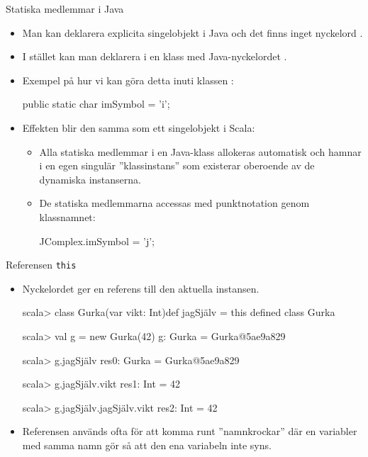 \begin{Slide}{Statiska medlemmar i Java}
\begin{itemize}
\item Man kan  deklarera explicita singelobjekt i Java och det finns inget nyckelord .

\item I stället kan man deklarera  i en klass med Java-nyckelordet .

\item Exempel på hur vi kan göra detta inuti klassen :

\begin{Code}[language=Java,basicstyle=\SlideFontSize{10}{12}\ttfamily\selectfont]
    public static char imSymbol = 'i';
\end{Code}

\item Effekten blir den samma som ett singelobjekt i Scala:
\begin{itemize}
\item Alla statiska medlemmar i en Java-klass allokeras automatisk och hamnar i en egen singulär ''klassinstans'' som existerar oberoende av de dynamiska instanserna.
\item De statiska medlemmarna accessas med punktnotation genom klassnamnet:
\begin{Code}[language=Java,basicstyle=\SlideFontSize{11}{13}\ttfamily\selectfont]
    JComplex.imSymbol = 'j';
\end{Code}

\end{itemize}


\end{itemize}
\end{Slide}



\begin{Slide}{Referensen \texttt{this}}\SlideFontSmall
\begin{itemize}
\item Nyckelordet  ger en referens till den aktuella instansen.
\begin{REPLnonum}
scala> class Gurka(var vikt: Int){def jagSjälv = this}
defined class Gurka

scala> val g = new Gurka(42)
g: Gurka = Gurka@5ae9a829

scala> g.jagSjälv
res0: Gurka = Gurka@5ae9a829

scala> g.jagSjälv.vikt
res1: Int = 42

scala> g.jagSjälv.jagSjälv.vikt
res2: Int = 42
\end{REPLnonum}
\item Referensen  används ofta för att komma runt ''namnkrockar'' där en variabler med samma namn gör så att den ena variabeln inte syns.
\end{itemize}
\end{Slide}



